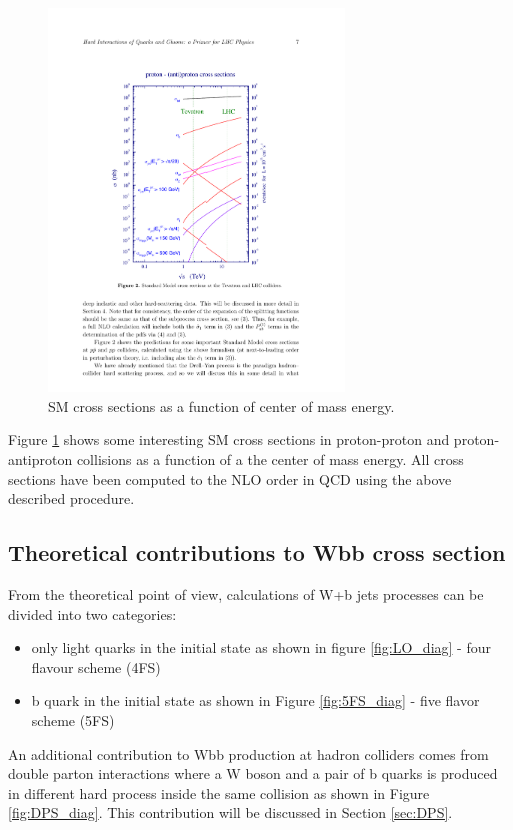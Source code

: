 \begin{figure}[htbp]
	\centering
		\includegraphics[width=0.7\textwidth]{Figures/pp_xsec.pdf}
	\caption[Proton-proton cross sections]{SM cross sections as a function of center of mass energy.\cite{Campbell:2006wx} }
	\label{fig:pp_xsec}
\end{figure}
\par Figure \ref{fig:pp_xsec} shows some interesting SM cross sections in proton-proton and proton-antiproton collisions as a function of a the center of mass energy. All cross sections have been computed to the NLO order in QCD using the above described procedure.

 

\subsection{Theoretical contributions to Wbb cross section}


From the theoretical point of view, calculations of W+b jets processes can be divided into two categories:
\begin{itemize}
\item only light quarks in the initial state as shown in figure \ref{fig:LO_diag} - four flavour scheme (4FS)
\item b quark in the initial state as shown in Figure \ref{fig:5FS_diag} - five flavor scheme (5FS) 
\end{itemize}
An additional contribution to Wbb production at hadron colliders comes from double parton interactions where a W boson and a pair of b quarks is produced in different hard process inside the same collision as shown in Figure \ref{fig:DPS_diag}. This contribution will be discussed in Section \ref{sec:DPS}.


